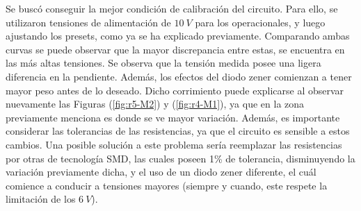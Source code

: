 \documentclass[a4paper]{article}
\begin{document}
Se buscó conseguir la mejor condición de calibración del circuito. Para ello, se utilizaron tensiones de alimentación de $10 \ V$ para los operacionales, y luego ajustando los presets, como ya se ha explicado previamente. Comparando ambas curvas se puede observar que la mayor discrepancia entre estas, se encuentra en las más altas tensiones. Se observa que la tensión medida posee una ligera diferencia en la pendiente. Además, los efectos del diodo zener comienzan a tener mayor peso antes de lo deseado. Dicho corrimiento puede explicarse al observar nuevamente las Figuras (\ref{fig:r5-M2}) y (\ref{fig:r4-M1}), ya que en la zona previamente menciona es donde se ve mayor variación. Además, es importante considerar las tolerancias de las resistencias, ya que el circuito es sensible a estos cambios. Una posible solución a este problema sería reemplazar las resistencias por otras de tecnología SMD, las cuales poseen 1\% de tolerancia, disminuyendo la variación previamente dicha, y el uso de un diodo zener diferente, el cuál comience a conducir a tensiones mayores (siempre y cuando, este respete la limitación de los $6 \ V$).
\end{document}
